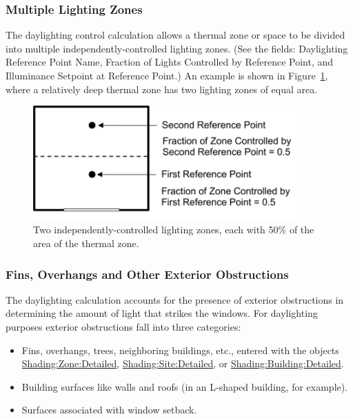 \subsubsection{Multiple Lighting Zones}\label{multiple-lighting-zones}

The daylighting control calculation allows a thermal zone or space to be divided into multiple independently-controlled lighting zones. (See the fields: Daylighting Reference Point Name, Fraction of Lights Controlled by Reference Point, and Illuminance Setpoint at Reference Point.) An example is shown in Figure~\ref{fig:two-independently-controlled-lighting-zones}, where a relatively deep thermal zone has two lighting zones of equal area.

\begin{figure}[hbtp] %
\centering
\includegraphics[width=0.9\textwidth, height=0.9\textheight, keepaspectratio=true]{media/image100.png}
\caption{Two independently-controlled lighting zones, each with 50\% of the area of the thermal zone. \protect \label{fig:two-independently-controlled-lighting-zones}}
\end{figure}

\subsubsection{Fins, Overhangs and Other Exterior Obstructions}\label{fins-overhangs-and-other-exterior-obstructions}

The daylighting calculation accounts for the presence of exterior obstructions in determining the amount of light that strikes the windows. For daylighting purposes exterior obstructions fall into three categories:

\begin{itemize}
  \item
    Fins, overhangs, trees, neighboring buildings, etc., entered with the objects \hyperref[shadingzonedetailed-000]{Shading:Zone:Detailed}, \hyperref[shadingsitedetailed-shadingbuildingdetailed]{Shading:Site:Detailed}, or \hyperref[shadingsitedetailed-shadingbuildingdetailed]{Shading:Building:Detailed}.
  \item
    Building surfaces like walls and roofs (in an L-shaped building, for example).
  \item
    Surfaces associated with window setback.
\end{itemize}

